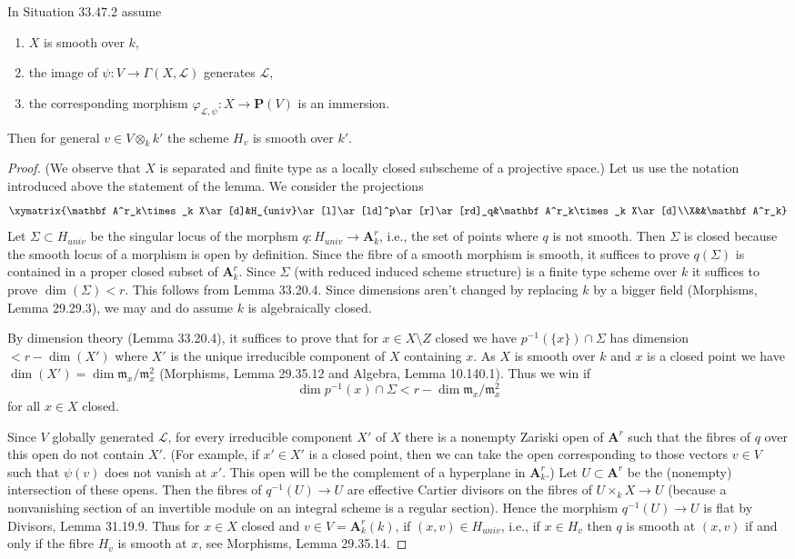 \begin{lemma}[33.47.3]
In Situation 33.47.2 assume
\begin{enumerate}
\item $X$ is smooth over $k$,
\item the image of $\psi:V\to\Gamma(X,\mathcal L)$ generates $\mathcal L$,
\item the corresponding morphism $\varphi_{\mathcal L,\psi}:X\to\mathbf P(V)$ is an immersion.
\end{enumerate}
Then for general $v\in V\otimes_k k'$ the scheme $H_v$ is smooth over $k'$.
\end{lemma}
\begin{proof}
(We observe that $X$ is separated and finite type as a locally closed subscheme of a projective space.) Let us use the notation introduced above the statement of the lemma. We consider the projections
\[
\xymatrix{\mathbf A^r_k\times_k X\ar[d]&H_{univ}\ar[l]\ar[ld]^p\ar[r]\ar[rd]_q&\mathbf A^r_k\times_k X\ar[d]\\X&&\mathbf A^r_k}
\]
Let $\Sigma\subset H_{univ}$ be the singular locus of the morphsm $q:H_{univ}\to\mathbf A^r_k$, i.e., the set of points where $q$ is not smooth. Then $\Sigma$ is closed because the smooth locus of a morphism is open by definition. Since the fibre of a smooth morphism is smooth, it suffices to prove $q(\Sigma)$ is contained in a proper closed subset of $\mathbf A^r_k$. Since $\Sigma$ (with reduced induced scheme structure) is a finite type scheme over $k$ it suffices to prove $\dim(\Sigma)<r$. This follows from Lemma 33.20.4. Since dimensions aren't changed by replacing $k$ by a bigger field (Morphisms, Lemma 29.29.3), we may and do assume $k$ is algebraically closed.

By dimension theory (Lemma 33.20.4), it suffices to prove that for $x\in X\setminus Z$ closed we have $p^{-1}(\{x\})\cap\Sigma$ has dimension $<r-\dim(X')$ where $X'$ is the unique irreducible component of $X$ containing $x$. As $X$ is smooth over $k$ and $x$ is a closed point we have $\dim(X')=\dim\mathfrak m_x/\mathfrak m_x^2$ (Morphisms, Lemma 29.35.12 and Algebra, Lemma 10.140.1). Thus we win if
\[\dim p^{-1}(x)\cap\Sigma<r-\dim\mathfrak m_x/\mathfrak m_x^2\]
for all $x\in X$ closed.

Since $V$ globally generated $\mathcal L$, for every irreducible component $X'$ of $X$ there is a nonempty Zariski open of $\mathbf A^r$ such that the fibres of $q$ over this open do not contain $X'$. (For example, if $x'\in X'$ is a closed point, then we can take the open corresponding to those vectors $v\in V$ such that $\psi(v)$ does not vanish at $x'$. This open will be the complement of a hyperplane in $\mathbf A^r_k$.) Let $U\subset\mathbf A^r$ be the (nonempty) intersection of these opens. Then the fibres of $q^{-1}(U)\to U$ are effective Cartier divisors on the fibres of $U\times_k X\to U$ (because a nonvanishing section of an invertible module on an integral scheme is a regular section). Hence the morphism $q^{-1}(U)\to U$ is flat by Divisors, Lemma 31.19.9. Thus for $x\in X$ closed and $v\in V=\mathbf A^r_k(k)$, if $(x,v)\in H_{univ}$, i.e., if $x\in H_v$ then $q$ is smooth at $(x,v)$ if and only if the fibre $H_v$ is smooth at $x$, see Morphisms, Lemma 29.35.14.


\end{proof}
